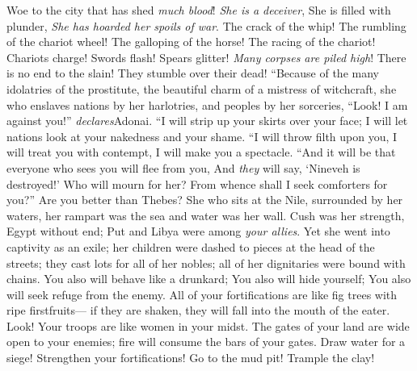 \begin{biblechapter} %
 Woe to the city that has shed \textit{much blood}! 
\textit{She is a deceiver}, 
She is filled with plunder, 
\textit{She has hoarded her spoils of war}.
\verse The crack of the whip! 
The rumbling of the chariot wheel! 
The galloping of the horse! 
The racing of the chariot!
\verse Chariots charge! 
Swords flash! 
Spears glitter! 
\textit{Many corpses are piled high}! 
There is no end to the slain! 
They stumble over their dead!
 “Because of the many idolatries of the prostitute, 
the beautiful charm of a mistress of witchcraft, 
she who enslaves nations by her harlotries, 
and peoples by her sorceries,
\verse “Look! I am against you!” \textit{declares}Adonai. 
“I will strip up your skirts over your face; 
I will let nations look at your nakedness and your shame.
\verse “I will throw filth upon you, 
I will treat you with contempt, 
I will make you a spectacle.
\verse “And it will be that everyone who sees you will flee from you, 
And \textit{they} will say, ‘Nineveh is destroyed!’ 
Who will mourn for her? 
From whence shall I seek comforters for you?”
 Are you better than Thebes? 
She who sits at the Nile, surrounded by her waters, 
her rampart was the sea and water was her wall.
\verse Cush was her strength, Egypt without end; 
Put and Libya were among \textit{your allies}.
\verse Yet she went into captivity as an exile; 
her children were dashed to pieces at the head of the streets; 
they cast lots for all of her nobles; 
all of her dignitaries were bound with chains.
\verse You also will behave like a drunkard; 
You also will hide yourself; 
You also will seek refuge from the enemy.
 All of your fortifications are like fig trees with ripe firstfruits— 
if they are shaken, they will fall into the mouth of the eater.
\verse Look! Your troops are like women in your midst. 
The gates of your land are wide open to your enemies; 
fire will consume the bars of your gates.
\verse Draw water for a siege! 
Strengthen your fortifications! 
Go to the mud pit! 
Trample the clay! 

\end{biblechapter}
